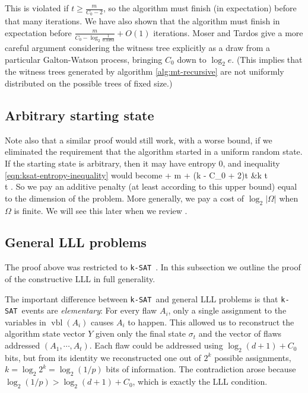 \documentclass{article}
\newcommand{\ksat}{\texttt{k-SAT}~}
\def\seqn#1\eeqn{\begin{align}#1\end{align}}
\begin{document}
This is violated if $t \geq \frac{m}{C_0 - 2}$, so the algorithm must finish (in expectation) before that many iterations.  We have also shown that the algorithm must finish in expectation before $\frac{m}{C_0 - \log_2 \frac{1}{0.3383}} + O(1)$ iterations.  Moser and Tardos give a more careful argument considering the witness tree explicitly as a draw from a particular Galton-Watson process, bringing $C_0$ down to $\log_2 e$.  (This implies that the witness trees generated by algorithm \ref{alg:mt-recursive} are not uniformly distributed on the possible trees of fixed size.)

\subsection{Arbitrary starting state}
\label{subsec:arbitrary}
Note also that a similar proof would still work, with a worse bound, if we eliminated the requirement that the algorithm started in a uniform random state.  If the starting state is arbitrary, then it may have entropy $0$, and inequality \ref{eqn:ksat-entropy-inequality} would become
\seqn
  n + m + (k - C_0 + 2)t &\leq k t \\
  \implies t \leq {} .
\eeqn
So we pay an additive penalty (at least according to this upper bound) equal to the dimension of the problem.  More generally, we pay a cost of $\log_2 |\Omega|$ when $\Omega$ is finite.  We will see this later when we review \cite{achlioptas2014random}.

\subsection{General LLL problems}
\label{subsec:general-lll}
The proof above was restricted to \ksat.  In this subsection we outline the proof of the constructive LLL in full generality.

The important difference between \ksat and general LLL problems is that \ksat events are \emph{elementary}: For every flaw $A_i$, only a single assignment to the variables in $\operatorname{vbl}(A_i)$ causes $A_i$ to happen.  This allowed us to reconstruct the algorithm state vector $Y$ given only the final state $\sigma_{t}$ and the vector of flaws addressed $(A_1, \cdots, A_t)$.  Each flaw could be addressed using $\log_2 (d+1) + C_0$ bits, but from its identity we reconstructed one out of $2^k$ possible assignments, $k = \log_2 2^k = \log_2 (1/p)$ bits of information.  The contradiction arose because $\log_2 (1/p) > \log_2 (d+1) + C_0$, which is exactly the LLL condition.
\end{document}
